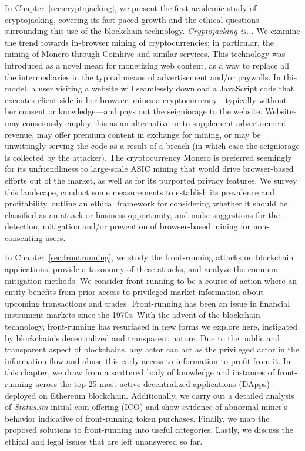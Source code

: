 In Chapter~\ref{sec:cryptojacking}, we present the first academic study of cryptojacking, covering its fast-paced growth and the ethical questions surrounding this use of the blockchain technology. \textit{Cryptojacking is... } We examine the trend towards in-browser mining of cryptocurrencies; in particular, the mining of Monero through Coinhive and similar services. This technology was introduced as a novel mean for monetizing web content, as a way to replace all the intermediaries in the typical means of advertisement and/or paywalls. In this model, a user visiting a website will seamlessly download a JavaScript code that executes client-side in her browser, mines a cryptocurrency---typically without her consent or knowledge---and pays out the seigniorage to the website. Websites may consciously employ this as an alternative or to supplement advertisement revenue, may offer premium content in exchange for mining, or may be unwittingly serving the code as a result of a breach (in which case the seigniorage is collected by the attacker). The cryptocurrency Monero is preferred seemingly for its unfriendliness to large-scale ASIC mining that would drive browser-based efforts out of the market, as well as for its purported privacy features. We survey this landscape, conduct some measurements to establish its prevalence and profitability, outline an ethical framework for considering whether it should be classified as an attack or business opportunity, and make suggestions for the detection, mitigation and/or prevention of browser-based mining for non-consenting users.


In Chapter~\ref{sec:frontrunning}, we study the front-running attacks on blockchain applications, provide a taxonomy of these attacks, and analyze the common mitigation methods. We consider front-running to be a course of action where an entity benefits from prior access to privileged market information about upcoming transactions and trades. Front-running has been an issue in financial instrument markets since the 1970s. With the advent of the blockchain technology, front-running has resurfaced in new forms we explore here, instigated by blockchain’s decentralized and transparent nature. Due to the public and transparent aspect of blockchains, any actor can act as the privileged actor in the information flow and abuse this early access to information to profit from it. In this chapter, we draw from a scattered body of knowledge and instances of front-running across the top 25 most active decentralized applications (DApps) deployed on Ethereum blockchain. Additionally, we carry out a detailed analysis of \textit{Status.im} initial coin offering (ICO) and show evidence of abnormal miner’s behavior indicative of front-running token purchases. Finally, we map the proposed solutions to front-running into useful categories. Lastly, we discuss the ethical and legal issues that are left unanswered so far.


